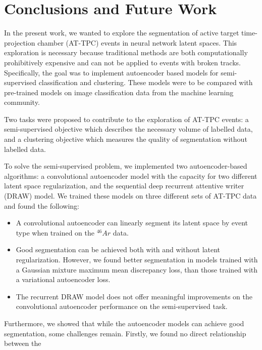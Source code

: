 \chapter{Conclusions and Future Work}

In the present work, we wanted to explore the segmentation of active target time-projection chamber (AT-TPC) events in neural network latent spaces. This exploration is necessary because traditional methods are both computationally prohibitively expensive and can not be applied to events with broken tracks. Specifically, the goal was to implement autoencoder based models for semi-supervised classification and clustering. These models were to be compared with pre-trained models on image classification data from the machine learning community.

Two tasks were proposed to contribute to the exploration of  AT-TPC events: a semi-supervised objective which describes the necessary volume of labelled data, and a clustering objective which measures the quality of segmentation without labelled data. 

To solve the semi-supervised problem, we implemented two autoencoder-based algorithms: a convolutional autoencoder model with the capacity for two different latent space regularization, and the sequential deep recurrent attentive writer (DRAW) model. We trained these models on three different sets of AT-TPC data and found the following:

\begin{itemize}
\item A convolutional autoencoder can linearly segment its latent space by event type when trained on the ${}^{46}Ar$ data.  
\item Good segmentation can be achieved both with and without latent regularization.  However, we found better segmentation in models trained with a Gaussian mixture maximum mean discrepancy loss, than those trained with a variational autoencoder loss. 
\item The recurrent DRAW  model does not offer meaningful improvements on the convolutional autoencoder performance on the semi-supervised task. 
\end{itemize}

Furthermore, we showed that while the autoencoder models can achieve good segmentation, some challenges remain. Firstly, we found no direct relationship between the 